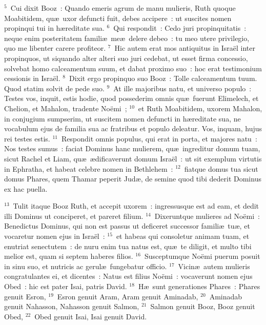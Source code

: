 ${}^{5}$~Cui dixit Booz~: Quando emeris agrum de manu mulieris, Ruth quoque Moabitidem, qu\ae\ uxor defuncti fuit, debes accipere~: ut suscites nomen propinqui tui in h\ae reditate sua.
${}^{6}$~Qui respondit~: Cedo juri propinquitatis~: neque enim posteritatem famili\ae\ me\ae\ delere debeo~: tu meo utere privilegio, quo me libenter carere profiteor.
${}^{7}$~Hic autem erat mos antiquitus in Isra\"el inter propinquos, ut siquando alter alteri suo juri cedebat, ut esset firma concessio, solvebat homo calceamentum suum, et dabat proximo suo~: hoc erat testimonium cessionis in Isra\"el.
${}^{8}$~Dixit ergo propinquo suo Booz~: Tolle calceamentum tuum. Quod statim solvit de pede suo.
${}^{9}$~At ille majoribus natu, et universo populo~: Testes vos, inquit, estis hodie, quod possederim omnis qu\ae\ fuerunt Elimelech, et Chelion, et Mahalon, tradente No\"emi~;
${}^{10}$~et Ruth Moabitidem, uxorem Mahalon, in conjugium sumpserim, ut suscitem nomen defuncti in h\ae reditate sua, ne vocabulum ejus de familia sua ac fratribus et populo deleatur. Vos, inquam, hujus rei testes estis.
${}^{11}$~Respondit omnis populus, qui erat in porta, et majores natu~: Nos testes sumus~: faciat Dominus hanc mulierem, qu\ae\ ingreditur domum tuam, sicut Rachel et Liam, qu\ae\ \ae dificaverunt domum Isra\"el~: ut sit exemplum virtutis in Ephratha, et habeat celebre nomen in Bethlehem~:
${}^{12}$~fiatque domus tua sicut domus Phares, quem Thamar peperit Jud\ae , de semine quod tibi dederit Dominus ex hac puella.


${}^{13}$~Tulit itaque Booz Ruth, et accepit uxorem~: ingressusque est ad eam, et dedit illi Dominus ut conciperet, et pareret filium.
${}^{14}$~Dixeruntque mulieres ad No\"emi~: Benedictus Dominus, qui non est passus ut deficeret successor famili\ae\ tu\ae , et vocaretur nomen ejus in Isra\"el~:
${}^{15}$~et habeas qui consoletur animam tuam, et enutriat senectutem~: de nuru enim tua natus est, qu\ae\ te diligit, et multo tibi melior est, quam si septem haberes filios.
${}^{16}$~Susceptumque No\"emi puerum posuit in sinu suo, et nutricis ac gerul\ae\ fungebatur officio.
${}^{17}$~Vicin\ae\ autem mulieris congratulantes ei, et dicentes~: Natus est filius No\"emi~: vocaverunt nomen ejus Obed~: hic est pater Isai, patris David.
${}^{18}$~H\ae\ sunt generationes Phares~: Phares genuit Esron,
${}^{19}$~Esron genuit Aram, Aram genuit Aminadab,
${}^{20}$~Aminadab genuit Nahasson, Nahasson genuit Salmon,
${}^{21}$~Salmon genuit Booz, Booz genuit Obed,
${}^{22}$~Obed genuit Isai, Isai genuit David.
